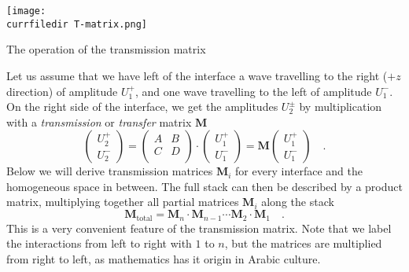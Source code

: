 \begin{marginfigure}
\texttt{[image: \\currfiledir T-matrix.png]}

\caption{The operation of the transmission matrix
\label{fig:surface_T_matrix}}
\end{marginfigure}

Let us assume that we have left of the interface a wave travelling to the right ($+z$ direction) of amplitude $U_1^+$, and one wave travelling to the left of amplitude $U_1^-$. On the right side of the interface, we get the amplitudes $U_2^\pm$ by multiplication with a \emph{transmission} or \emph{transfer} matrix $\mathbf{M}$
\begin{equation}
\begin{pmatrix}
U_2^+ \\ U_2^-
\end{pmatrix}
= 
\begin{pmatrix}
A & B \\ C & D \\
\end{pmatrix}
\cdot
\begin{pmatrix}
U_1^+ \\ U_1^-
\end{pmatrix}
%
= \mathbf{M}
\begin{pmatrix}
U_1^+ \\ U_1^-
\end{pmatrix} \quad . \label{eq:def_T_matrix}
\end{equation}
Below we will derive transmission matrices $\mathbf{M}_i$ for every interface and the homogeneous space in between. The full stack can then be described by a product matrix, multiplying together all partial matrices $\mathbf{M}_i$ along the stack
\begin{equation}
\mathbf{M}_\text{total} = \mathbf{M}_n \cdot  \mathbf{M}_{n-1} \cdots\mathbf{M}_2 \cdot  \mathbf{M}_{1} \quad . 
\end{equation}
This is a very convenient feature of the transmission matrix.
Note that we label the interactions from left to right with $1$ to $n$, but the matrices are multiplied from right to left, as mathematics has it origin in Arabic culture.



